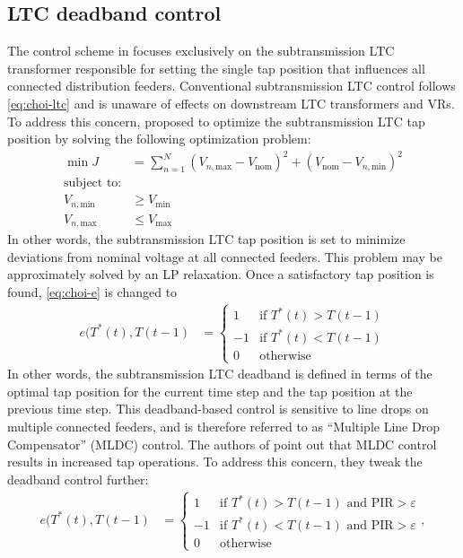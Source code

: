 \documentclass[10pt,letterpaper]{article}
\begin{document}
\subsection{LTC deadband control}
The control scheme in \cite{choi2009} focuses exclusively on the subtransmission LTC transformer responsible for setting the single tap position that influences all connected distribution feeders. Conventional subtransmission LTC control follows \eqref{eq:choi-ltc} and is unaware of effects on downstream LTC transformers and VRs. To address this concern, \cite{choi2001} proposed to optimize the subtransmission LTC tap position by solving the following optimization problem:
\begin{align}\label{eq:choi-opt}
\min J &= \sum_{n=1}^{N} (V_{n,\text{max}} - V_{\text{nom}})^2 + (V_\text{nom} - V_{n,\text{min}})^2 \\
\nonumber \text{subject to:}& \\
\nonumber V_{n,\text{min}} &\geq V_\text{min} \\
\nonumber V_{n,\text{max}} &\leq V_\text{max}
\end{align}
In other words, the subtransmission LTC tap position is set to minimize deviations from nominal voltage at all connected feeders. This problem may be approximately solved by an LP relaxation. Once a satisfactory tap position is found, \eqref{eq:choi-e} is changed to
\begin{align*}
e(T^*(t),T(t-1) &= \begin{cases}
1 &\mbox{if }T^*(t) > T(t-1) \\
-1 &\mbox{if }T^*(t) < T(t-1) \\
0 &\mbox{otherwise}\end{cases}
\end{align*}
In other words, the subtransmission LTC deadband is defined in terms of the optimal tap position for the current time step and the tap position at the previous time step. This deadband-based control is sensitive to line drops on multiple connected feeders, and is therefore referred to as ``Multiple Line Drop Compensator'' (MLDC) control. The authors of \cite{choi2009} point out that MLDC control results in increased tap operations. To address this concern, they tweak the deadband control further:
\begin{align}\label{eq:choi-e-pir}
e(T^*(t),T(t-1) &= \begin{cases}
1 &\mbox{if }T^*(t) > T(t-1) \mbox{ and PIR}>\varepsilon \\
-1 &\mbox{if }T^*(t) < T(t-1) \mbox{ and PIR}>\varepsilon \\
0 &\mbox{otherwise}\end{cases},
\end{align}
\end{document}
